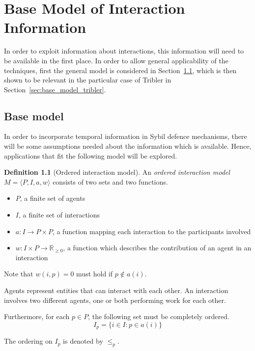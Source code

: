 \documentclass[a4paper,11pt]{book}
\newcommand{\bb}{\mathbb}
\theoremstyle{definition}
\newtheorem{definition}{Definition}
\begin{document}
\chapter{Base Model of Interaction Information}
\label{chap:base_model}

In order to exploit information about interactions, this information will need to be
available in the first place. In order to allow general applicability of the
techniques, first the general model is considered in Section~\ref{sec:base_model}, which is then shown to be
relevant in the particular case of Tribler in Section~\ref{sec:base_model_tribler}.


\section{Base model}
\label{sec:base_model}

In order to incorporate temporal information in Sybil defence mechanisms,
there will be some assumptions needed about the information which is available.
Hence, applications that fit the following model will be explored.

\begin{definition}[Ordered interaction model]
    An \emph{ordered interaction model} $M=\langle P, I, a, w \rangle$ consists of two sets and two functions.
    
    \begin{itemize}
        \item $P$, a finite set of agents
        \item $I$, a finite set of interactions
        \item $a: I \to P \times P$, a function mapping each interaction to the participants involved
        \item $w: I \times P \to \bb{R}_{\geq0}$, a function which describes the contribution of an agent in an interaction
    \end{itemize}

    Note that $w(i, p) = 0$ must hold if $p \notin a(i)$.

    Agents represent entities that can interact with each other.
    An interaction involves two different agents, one or both performing
    work for each other. 
   
    Furthermore, for each $p \in P$, the following set must be completely ordered.
    \begin{equation*}
        I_p = \{i \in I : p \in a(i)\}
    \end{equation*}

    The ordering on $I_p$ is denoted by $\leq_p$.
\end{definition}
\end{document}
